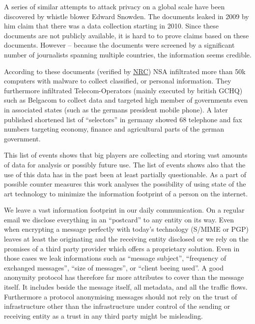 A series of similar attempts to attack privacy on a global scale have been discovered by whistle blower Edward Snowden. The documents leaked in 2009 by him claim that there was a data collection starting in 2010. Since these documents are not publicly available, it is hard to to prove claims based on these documents. However -- because  the documents were screened by a significant number of journalists spanning multiple countries, the information seems credible.

According to these documents (verified by \href{http://www.nrc.nl/nieuws/2013/11/23/nederland-sinds-1946-doelwit-van-nsa}{NRC}) NSA infiltrated more than 50k computers with malware to collect classified, or personal information. They furthermore infiltrated Telecom-Operators (mainly executed by british GCHQ) such as Belgacom to collect data and targeted high member of governments even in associated states (such as the germans president mobile phone). A later published shortened list of ``selectors'' in germany showed 68 telephone and fax numbers targeting economy, finance and agricultural parts of the german government.

This list of events shows that big players are collecting and storing vast amounts of data for analysis or possibly future use. The list of events shows also that the use of this data has in the past been at least partially questionable. As a part of possible counter measures this work analyses the possibility of using state of the art technology to minimize the information footprint of a person on the internet. 

We leave a vast information footprint in our daily communication. On a regular email we disclose everything in an ``postcard'' to any entity on its way. Even when encrypting a message perfectly with today's technology (S/MIME\cite{RFC2045} or PGP\cite{RFC2015}) leaves at least the originating and the receiving entity disclosed or we rely on the promises of a third party provider which offers a proprietary solution. Even in those cases we leak informations such as ``message subject'', ``frequency of exchanged messages'', ``size of messages'', or ``client beeing used''. A good anonymity protocol has therefore far more attributes to cover than the message itself. It includes beside the message itself, all metadata, and all the traffic flows. Furthermore a protocol anonymising messages should not rely on the trust of infrastructure other than the infrastructure under control of the sending or receiving entity as a trust in any third party might be misleading.  

